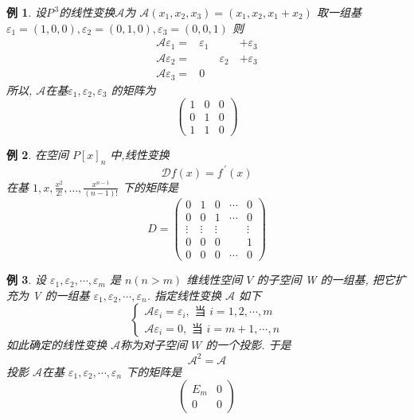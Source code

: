 \documentclass[13pt]{beamer}
\newtheorem{exa}{例}
\def\A{\mathscr{A}}
\begin{document}
\begin{frame}
\begin{exa}
设$P^{\,3}$的线性变换$\A$为 $\A\left(x_{1}, x_{2}, x_{3}\right)=\left(x_{1}, x_{2}, x_{1}+x_{2}\right)$
取一组基 $\varepsilon_{1}=(1,0,0), \varepsilon_{2}=(0,1,0), \varepsilon_{3}=(0,0,1)$
则 
$$
\begin{array}{llll}
\mathscr{A} \varepsilon_{1} = &  \varepsilon_{1} & \quad& +\varepsilon_{3}\\
\mathscr{A} \varepsilon_{2} = & \quad & \varepsilon_{2}& +\varepsilon_{3}\\
\mathscr{A} \varepsilon_{3} = &  0& &
\end{array}
$$
所以, $\A$在基$\varepsilon_{1}, \varepsilon_{2}, \varepsilon_{3}$ 的矩阵为
\pause  $$\left(\begin{array}{lll}1 & 0 & 0 \\ 0 & 1 & 0 \\ 1 & 1 & 0\end{array}\right)$$
\end{exa}
\end{frame}

\begin{frame}
\begin{exa}
	在空间 $P[x]_n$ 中,线性变换
	\[
	\mathscr{D} f(x)=f^{\,\prime}(x)
	\]
	在基 $1, x, \frac{x^{2}}{2 !}, \ldots, \frac{x^{n-1}}{(n-1) !}$ 下的矩阵是\pause
	\[
	{D}=\left(\begin{array}{ccccc}
	0 & 1 & 0 & \cdots & 0 \\
	0 & 0 & 1 & \cdots & 0 \\
	\vdots & \vdots & \vdots & & \vdots \\
	0 & 0 & 0 & & 1 \\
	0 & 0 & 0 & \cdots & 0
	\end{array}\right)
	\]
\end{exa}
\end{frame}


\begin{frame}
\begin{exa}
设 ${\varepsilon}_{1}, {\varepsilon}_{2}, \cdots, {\varepsilon}_{m}$ 是 $n(n>m)$ 维线性空间 $V$ 的子空间
W 的一组基, 把它扩充为 V 的一组基 $\varepsilon_{1}, \varepsilon_{2}, \cdots, \varepsilon_{n}$.  指定线性变换
$\A$ 如下
\[
\left\{\begin{array}{l}
\mathscr{A} {\varepsilon}_{i}={\varepsilon}_{i}, \text { 当 } i=1,2, \cdots, m \\
\mathscr{A} {\varepsilon}_{i}={0}, \text { 当 } i=m+1, \cdots, n
\end{array}\right.
\]
如此确定的线性变换 $\A$称为对子空间 $W$ 的一个投影. 于是
\[
\mathscr{A}^{2}=\mathscr{A}
\]
投影 $\A$在基 ${\varepsilon}_{1}, {\varepsilon}_{2}, \cdots, {\varepsilon}_{n}$ 下的矩阵是
$$\left(\begin{array}{cc}
E_m & 0\\
0& 0
\end{array}\right)$$
\end{exa}
\end{frame}
\end{document}
